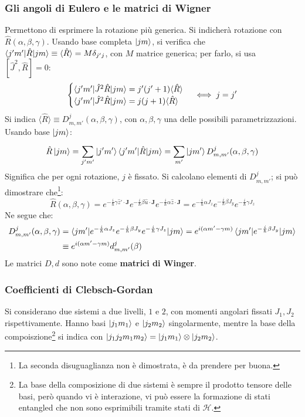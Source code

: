 \documentclass[10pt, a4paper]{scrartcl} %
\numberwithin{equation}{subsection}
\theoremstyle{style2}
\theoremstyle{style1}
\begin{document}
\subsubsection{Gli angoli di Eulero e le matrici di Wigner}
Permettono di esprimere la rotazione pi\`u generica. Si indicher\`a rotazione con $\hat{R}(\alpha ,\beta ,\gamma)$. Usando base completa $\ket{jm} $, si verifica che $\braket{j'm'|\hat{R}|jm} \equiv \langle \hat{R} \rangle= M\delta _{j'j} $, con $M$ matrice generica; per farlo, si usa $[\hat{J}^2 , \hat{R}] = 0$:
\[
\begin{cases}
	\braket{j'm'|\hat{J}^2 \hat{R}|jm}  = j' (j'+1) \langle \hat{R} \rangle\\
	\braket{j'm'|\hat{J}^2 \hat{R}|jm} = j(j+1) \langle \hat{R} \rangle
\end{cases} \iff j = j'
\] 
Si indica $\langle \hat{R} \rangle\equiv D^j _{m , m'} (\alpha ,\beta ,\gamma)$, con $\alpha ,\beta ,\gamma$ una delle possibili parametrizzazioni. Usando base $\ket{jm} $:
\[
\hat{R} \ket{jm}  = \sum_{j'm'}^{} \ket{j'm'} \braket{j'm'|\hat{R}|jm} = \sum_{m'}^{} \ket{jm'} D_{m,m'} ^j (\alpha ,\beta ,\gamma)
\] 
Significa che per ogni rotazione, $j$ \`e fissato. Si calcolano elementi di $D^j_{m,m'} $; si pu\`o dimostrare che\footnote{La seconda disuguaglianza non \`e dimostrata, \`e da prendere per buona.}:
\[
\hat{R}(\alpha ,\beta ,\gamma) = e^{-\frac{i}{\hbar }  \gamma \hat{z}' \cdot \mathbf{J} } e^{-\frac{i}{\hbar } \beta  \hat{u} \cdot \mathbf{J} } e^{-\frac{i}{\hbar } \alpha \hat{z} \cdot \mathbf{J} }= e^{-\frac{i}{\hbar } \alpha  J_z}  e^{-\frac{i}{\hbar } \beta J_y} e^{-\frac{i}{\hbar } \gamma J_z}  
\] 
Ne segue che:
\[
	\begin{split}
		D^j_{m,m'} (\alpha ,\beta ,\gamma) &= \braket{jm'|e^{-\frac{i}{\hbar } \alpha  J_z}  e^{-\frac{i}{\hbar } \beta J_y} e^{-\frac{i}{\hbar } \gamma J_z}  | jm} = e^{i(\alpha m' - \gamma m)}  \braket{jm'|e^{-\frac{i}{\hbar } \beta J_y} | jm} \\
						   &\equiv  e^{i (\alpha m' - \gamma m)} d^j_{m,m'} (\beta )
	\end{split}
\] 
Le matrici $D,d$ sono note come \textbf{matrici di Winger}. 
\subsubsection{Coefficienti di Clebsch-Gordan}
Si considerano due sistemi a due livelli, $1$ e $2$, con momenti angolari fissati $J_1,J_2$ rispettivamente. Hanno basi $\ket{j_1m_1} $ e $\ket{j_2m_2} $ singolarmente, mentre la base della compoiszione\footnote{La base della composizione di due sistemi \`e sempre il prodotto tensore delle basi, per\`o quando vi \`e interazione, vi pu\`o essere la formazione di stati entangled che non sono esprimibili tramite stati di $\mathcal{H}$.} si indica con $\ket{j_1j_2m_1m_2} = \ket{j_1m_1} \otimes \ket{j_2m_2} $.
\end{document}
